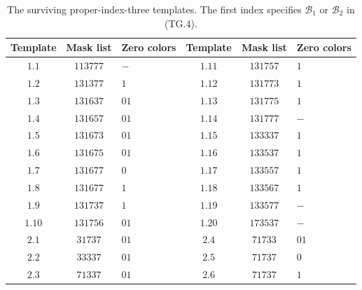 \begin{table}[ht]
\centering
\begin{tabular}{ccl|ccl}
Template&Mask list&Zero colors&Template&Mask list&Zero colors\\\hline
$1.1$&$113777$&$-$&$1.11$&$131757$&$1$\\
$1.2$&$131377$&$1$&$1.12$&$131773$&$1$\\
$1.3$&$131637$&$01$&$1.13$&$131775$&$1$\\
$1.4$&$131657$&$01$&$1.14$&$131777$&$-$\\
$1.5$&$131673$&$01$&$1.15$&$133337$&$1$\\
$1.6$&$131675$&$01$&$1.16$&$133537$&$1$\\
$1.7$&$131677$&$0$&$1.17$&$133557$&$1$\\
$1.8$&$131677$&$1$&$1.18$&$133567$&$1$\\
$1.9$&$131737$&$1$&$1.19$&$133577$&$-$\\
$1.10$&$131756$&$01$&$1.20$&$173537$&$-$\\\hline
$2.1$&$31737$&$01$&$2.4$&$71733$&$01$\\
$2.2$&$33337$&$01$&$2.5$&$71737$&$0$\\
$2.3$&$71337$&$01$&$2.6$&$71737$&$1$
\end{tabular}
\caption{The surviving proper-index-three templates. The first index
specifies $\mathcal B_1$ or $\mathcal B_2$ in (TG.4).}
\label{tab:k12-ternary-templates}
\end{table}

